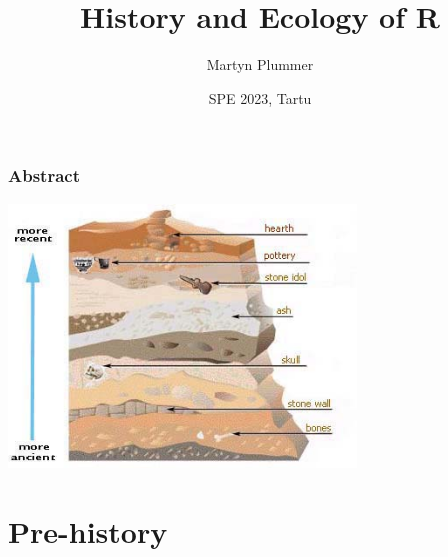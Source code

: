 \documentclass[svgnames, aspectratio=169]{beamer}
\title[R history] %
{History and Ecology of R}
\subtitle
{} %
\author %
{Martyn Plummer}
\institute[IARC] %
{
  University of Warwick, UK
}
\date %
{SPE 2023, Tartu}
\begin{document}
\begin{frame}[plain]
  \titlepage
\end{frame}





\begin{frame}
  \frametitle{Abstract}

  \includegraphics[height=7cm]{figures/stratigraphy1.jpg}
  
\end{frame}


\section{Pre-history}
\end{document}
